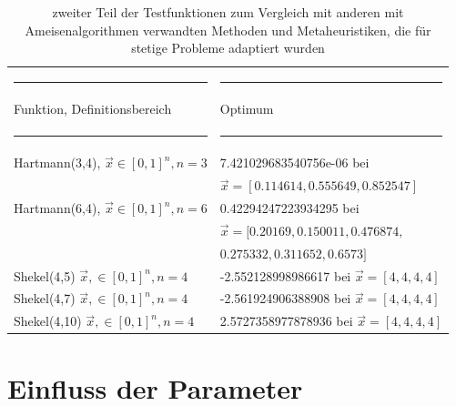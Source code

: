 \documentclass[fontsize=12, a4aper]{scrartcl}
\newcommand\Tstrut{\rule{0pt}{3ex}}           %
\begin{document}
	\bigskip
	
	\begin{table}[H]
		
		\fontsize{10pt}{12pt}
		
		\caption{zweiter Teil der Testfunktionen zum Vergleich mit anderen mit Ameisenalgorithmen verwandten Methoden und Metaheuristiken, die für stetige Probleme adaptiert wurden}
		
		\label{schwereTestfunktionenTeil2}
		
		\begin{tabularx}{\textwidth}{l|l}
			
			\rule{6.4cm}{0.4pt} & \rule{8cm}{0.4pt}\\
			
			Funktion, Definitionsbereich & Optimum\\
			
			\rule{6.4cm}{0.4pt} & \rule{8cm}{0.4pt}\\
			
			Hartmann(3,4), \(\overrightarrow{x} \in [0,1]^n, n=3\) & 7.421029683540756e-06 bei\Tstrut\\
			& \(\overrightarrow{x} = [0.114614, 0.555649, 0.852547]\)\\
			
			Hartmann(6,4), \(\overrightarrow{x} \in [0,1]^n, n=6\) & 0.42294247223934295 bei\Tstrut\\
			& \(\overrightarrow{x} = [0.20169, 0.150011, 0.476874,\)\\
			& \(0.275332, 0.311652, 0.6573]\) \\
			
			Shekel(4,5) \(\overrightarrow{x}, \in [0,1]^n, n = 4\) & -2.552128998986617 bei \(\overrightarrow{x} = [4, 4 , 4, 4]\)\Tstrut\\
			
			Shekel(4,7) \(\overrightarrow{x}, \in [0,1]^n, n = 4\) & -2.561924906388908 bei \(\overrightarrow{x} = [4, 4 , 4, 4]\)\Tstrut\\ 
			
			Shekel(4,10) \(\overrightarrow{x}, \in [0,1]^n, n = 4\) & 2.5727358977878936 bei \(\overrightarrow{x} = [4, 4 , 4, 4]\)\Tstrut\\
			
		\end{tabularx}
		
	\end{table}
	
	\section{Einfluss der Parameter}
	
\end{document}
